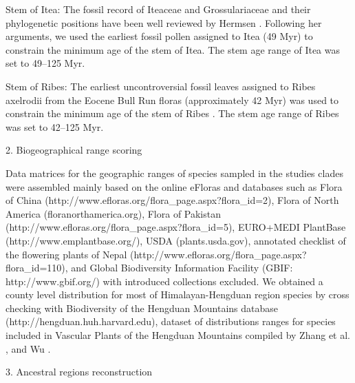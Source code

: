 \documentclass[10pt]{article}
\begin{document}
Stem of Itea: The fossil record of Iteaceae and Grossulariaceae and
their phylogenetic positions have been well reviewed by Hermsen
\citep{Hermsen 2013}. Following her arguments, we used the earliest
fossil pollen assigned to Itea (49 Myr) to constrain the minimum age
of the stem of Itea. The stem age range of Itea was set to 49--125
Myr.

Stem of Ribes: The earliest uncontroversial fossil leaves assigned to
Ribes axelrodii from the Eocene Bull Run floras (approximately 42 Myr)
was used to constrain the minimum age of the stem of Ribes
\citep{Hermsen 2005}. The stem age range of Ribes was set to 42--125
Myr.

2. Biogeographical range scoring

Data matrices for the geographic ranges of species sampled in the
studies clades were assembled mainly based on the online eFloras and
databases such as Flora of China
(http://www.efloras.org/flora_page.aspx?flora_id=2), Flora of North
America (floranorthamerica.org), Flora of Pakistan
(http://www.efloras.org/flora_page.aspx?flora_id=5), EURO+MEDI
PlantBase (http://www.emplantbase.org/), USDA (plants.usda.gov),
annotated checklist of the flowering plants of Nepal
(http://www.efloras.org/flora_page.aspx?flora_id=110), and Global
Biodiversity Information Facility (GBIF: http://www.gbif.org/) with
introduced collections excluded. We obtained a county level
distribution for most of Himalayan-Hengduan region species by cross
checking with Biodiversity of the Hengduan Mountains database
(http://hengduan.huh.harvard.edu), dataset of distributions ranges for
species included in Vascular Plants of the Hengduan Mountains compiled
by Zhang et al. \citep{Zhang, Boufford et al. 2009}, and Wu \citep{Wu
  2008}.

3. Ancestral regions reconstruction




\end{document}
